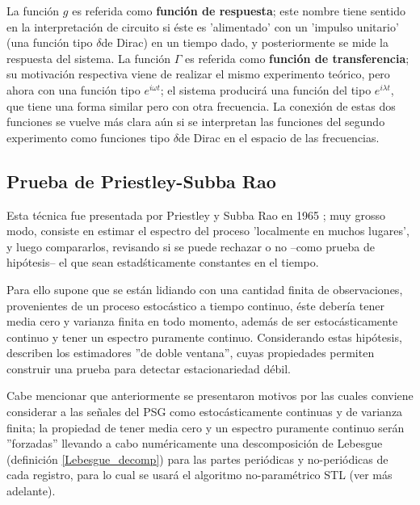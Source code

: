 \documentclass[12pt,a4paper]{mitthesis}
\newcommand{\ddd}{$\delta$}
\begin{document}
La funci\'on $g$ es referida como \textbf{funci\'on de respuesta}; este nombre tiene sentido en la
interpretaci\'on de circuito si \'este es 'alimentado' con un 'impulso unitario' (una funci\'on
tipo \ddd de Dirac) en un tiempo dado, y posteriormente se mide la respuesta del sistema.
La funci\'on $\Gamma$ es referida como \textbf{funci\'on de transferencia}; su motivaci\'on
respectiva viene de realizar el mismo experimento te\'orico, pero ahora con una funci\'on tipo 
$e^{i \omega t}$; el sistema producir\'a una funci\'on del tipo $e^{i\lambda t}$, que tiene una 
forma similar pero con otra frecuencia. La conexi\'on de estas dos funciones se vuelve m\'as clara 
a\'un si se interpretan las funciones del segundo experimento como funciones tipo \ddd de Dirac en 
el espacio de las frecuencias.


\subsection{Prueba de Priestley-Subba Rao}

Esta t\'ecnica fue presentada por Priestley y Subba Rao en 1965 \cite{Priestley69}; muy grosso 
modo, consiste en estimar el espectro del proceso 'localmente en muchos lugares', y luego 
compararlos, revisando si se puede rechazar o no --como prueba de hip\'otesis-- el que sean 
estad\'sticamente constantes en el tiempo.

Para ello supone que se est\'an lidiando con una cantidad finita de observaciones, provenientes de 
un proceso estoc\'astico a tiempo continuo, \'este deber\'ia tener media cero y varianza finita en 
todo momento, adem\'as de ser estoc\'asticamente continuo y tener un espectro puramente continuo.
Considerando estas hip\'otesis, describen los estimadores ''de doble ventana'', cuyas propiedades 
permiten construir una prueba para detectar estacionariedad d\'ebil.

Cabe mencionar que anteriormente se presentaron motivos por las cuales conviene considerar a las 
se\~nales del PSG como estoc\'asticamente continuas y de varianza finita; la propiedad de tener 
media cero y un espectro puramente continuo ser\'an ''forzadas'' llevando a cabo num\'ericamente
una descomposici\'on de Lebesgue (definici\'on \ref{Lebesgue_decomp}) para las partes peri\'odicas 
y no-peri\'odicas de cada registro, para lo cual se usar\'a el algoritmo no-param\'etrico STL (ver 
m\'as adelante).
\end{document}
